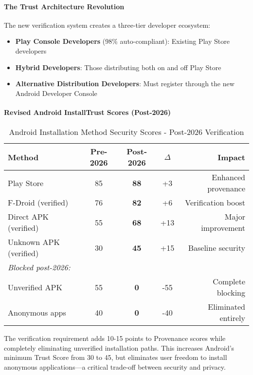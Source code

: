 \documentclass[11pt,a4paper]{article}
\begin{document}
\paragraph{The Trust Architecture Revolution}
The new verification system creates a three-tier developer ecosystem:
\begin{itemize}
    \item \textbf{Play Console Developers} (98\% auto-compliant): Existing Play Store developers
    \item \textbf{Hybrid Developers}: Those distributing both on and off Play Store
    \item \textbf{Alternative Distribution Developers}: Must register through the new Android Developer Console
\end{itemize}

\paragraph{Revised Android InstallTrust Scores (Post-2026)}
\begin{table}[h]
\centering
\caption{Android Installation Method Security Scores - Post-2026 Verification}
\begin{tabular}{lcccr}
\toprule
\textbf{Method} & \textbf{Pre-2026} & \textbf{Post-2026} & \textbf{$\Delta$} & \textbf{Impact} \\
\midrule
Play Store & 85 & \textbf{88} & +3 & Enhanced provenance \\
F-Droid (verified) & 76 & \textbf{82} & +6 & Verification boost \\
Direct APK (verified) & 55 & \textbf{68} & +13 & Major improvement \\
Unknown APK (verified) & 30 & \textbf{45} & +15 & Baseline security \\
\midrule
\textit{Blocked post-2026:} \\
Unverified APK & 55 & \textbf{0} & -55 & Complete blocking \\
Anonymous apps & 40 & \textbf{0} & -40 & Eliminated entirely \\
\bottomrule
\end{tabular}
\end{table}

The verification requirement adds 10-15 points to Provenance scores while completely eliminating unverified installation paths. This increases Android's minimum Trust Score from 30 to 45, but eliminates user freedom to install anonymous applications—a critical trade-off between security and privacy.
\end{document}

